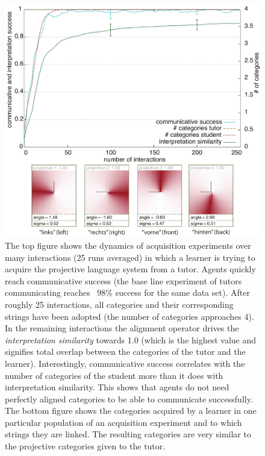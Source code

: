 \begin{figure} 
\begin{center}
\includegraphics[width=0.8\columnwidth]{figs/category-acquisition-projective-results+categories}
\end{center}
\caption[Results acquisition of the projective system]{
The top figure shows the dynamics of 
acquisition experiments over many interactions (25 runs averaged) in which 
a learner is trying to acquire the projective language system from a tutor.
Agents quickly reach communicative success (the base line experiment of tutors communicating 
reaches ~98\% success for the same data set). After roughly 25 interactions, all categories and their 
corresponding strings have been adopted (the number of categories approaches 4). 
In the remaining interactions the alignment operator drives the \emph{interpretation
similarity} towards 1.0 (which is the highest value and signifies total overlap between the categories
of the tutor and the learner). Interestingly, communicative success correlates
with the number of categories of the student more than it does with interpretation similarity.
This shows that agents do not need perfectly aligned categories to be able to communicate successfully.
The bottom figure shows the categories acquired by a learner in one 
particular population of an acquisition experiment and to which strings they are linked. 
The resulting categories are very similar to the projective categories given to the tutor.}
\label{f:category-acquisition-projective-results}
\end{figure}

